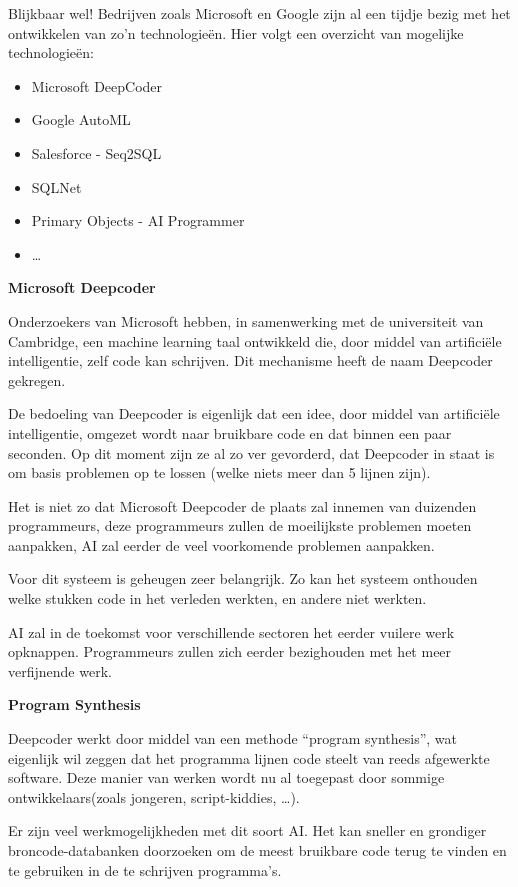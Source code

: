 Blijkbaar wel! Bedrijven zoals Microsoft en Google zijn al een tijdje bezig met het ontwikkelen van zo'n technologieën. Hier volgt een overzicht van mogelijke technologieën:
\begin{itemize}
	\item Microsoft DeepCoder
	\item Google AutoML
	\item Salesforce - Seq2SQL
	\item SQLNet
	\item Primary Objects - AI Programmer
	\item \ldots
\end{itemize}

\textbf{Microsoft Deepcoder}

Onderzoekers van Microsoft hebben, in samenwerking met de universiteit van Cambridge, een machine learning taal ontwikkeld die, door middel van artificiële intelligentie, zelf code kan schrijven.
Dit mechanisme heeft de naam Deepcoder gekregen.

De bedoeling van Deepcoder is eigenlijk dat een idee, door middel van artificiële intelligentie, omgezet wordt naar bruikbare code en dat binnen een paar seconden. Op dit moment zijn ze al zo ver gevorderd, dat Deepcoder in staat is om basis problemen op te lossen (welke niets meer dan 5 lijnen zijn).

Het is niet zo dat Microsoft Deepcoder de plaats zal innemen van duizenden programmeurs, deze programmeurs zullen de moeilijkste problemen moeten aanpakken, AI zal eerder de veel voorkomende problemen aanpakken. 

Voor dit systeem is geheugen zeer belangrijk. Zo kan het systeem onthouden welke stukken code in het verleden werkten, en andere niet werkten.

AI zal in de toekomst voor verschillende sectoren het eerder vuilere werk opknappen. Programmeurs zullen zich eerder bezighouden met het meer verfijnende werk.

\textbf{Program Synthesis}

Deepcoder werkt door middel van een methode “program synthesis”, wat eigenlijk wil zeggen dat het programma lijnen code steelt van reeds afgewerkte software. Deze manier van werken wordt nu al toegepast door sommige ontwikkelaars(zoals jongeren, script-kiddies, …). 

Er zijn veel werkmogelijkheden met dit soort AI. Het kan sneller en grondiger broncode-databanken doorzoeken om de meest bruikbare code terug te vinden en te gebruiken in de te schrijven programma’s. 

